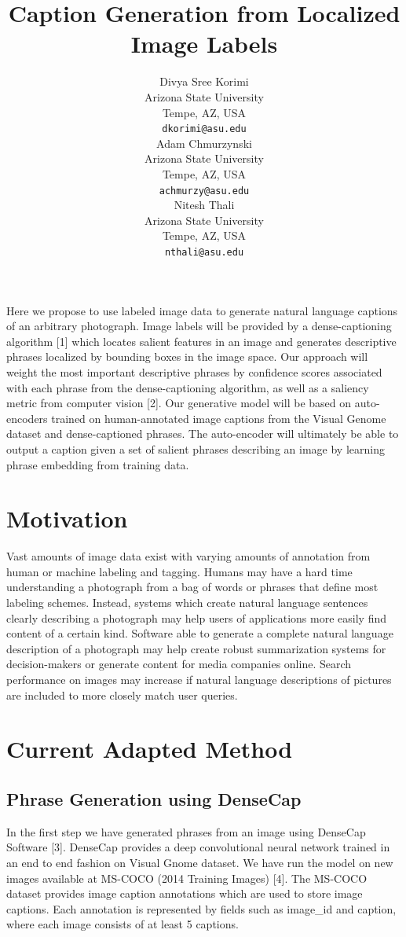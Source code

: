 \documentclass[11pt]{article}
\title{Caption Generation from Localized Image Labels}
\author{Divya Sree Korimi \\
  Arizona State University \\
  Tempe, AZ, USA\\
  {\tt dkorimi@asu.edu} \\\And
  Adam Chmurzynski \\
  Arizona State University \\
  Tempe, AZ, USA\\
  {\tt achmurzy@asu.edu}  \\\And
	Nitesh Thali \\
 Arizona State University \\
  Tempe, AZ, USA\\
  {\tt nthali@asu.edu} \\}
\date{}
\begin{document}
\maketitle
\section*{}
Here we propose to use labeled image data to generate natural language captions of an arbitrary photograph. Image labels will be provided by a dense-captioning algorithm [1] which locates salient features in an image and generates descriptive phrases localized by bounding boxes in the image space. Our approach will weight the most important descriptive phrases by confidence scores associated with each phrase from the dense-captioning algorithm, as well as a saliency metric from computer vision [2]. Our generative model will be based on auto-encoders trained on human-annotated image captions from the Visual Genome dataset and dense-captioned phrases. The auto-encoder will ultimately be able to output a caption given a set of salient phrases describing an image by learning phrase embedding from training data.  

\section{Motivation}
Vast amounts of image data exist with varying amounts of annotation from human or machine labeling and tagging. Humans may have a hard time understanding a photograph from a bag of words or phrases that define most labeling schemes. Instead, systems which create natural language sentences clearly describing a photograph may help users of applications more easily find content of a certain kind. Software able to generate a complete natural language description of a photograph may help create robust summarization systems for decision-makers or generate content for media companies online. Search performance on images may increase if natural language descriptions of pictures are included to more closely match user queries. 


\section{Current Adapted Method}
\subsection{Phrase Generation using DenseCap}
In the first step we have generated phrases from an image using DenseCap Software [3]. DenseCap provides a deep convolutional neural network trained in an end to end fashion on Visual Gnome dataset. We have run the model on new images available at MS-COCO (2014 Training Images) [4]. The MS-COCO dataset provides image caption annotations which are used to store image captions. Each annotation is represented by fields such as image\_id and caption, where each image consists of at least 5 captions.
\end{document}
